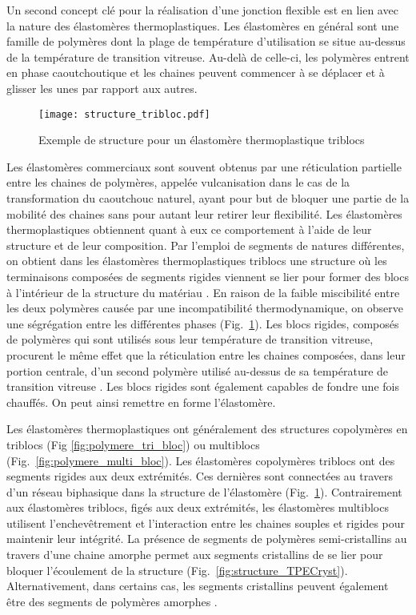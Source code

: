 Un second concept clé pour la réalisation d'une jonction flexible est en lien avec la nature des élastomères thermoplastiques. 
Les élastomères en général sont une famille de polymères dont la plage de température d'utilisation se situe au-dessus de la température de transition vitreuse. 
Au-delà de celle-ci, les polymères entrent en phase caoutchoutique et les chaines peuvent commencer à se déplacer et à glisser les unes par rapport aux autres. 

\begin{figure}[h]
	\centering
	\texttt{[image: structure\_tribloc.pdf]}
	\caption{Exemple de structure pour un élastomère thermoplastique triblocs}
	\label{fig:structure_tribloc}
\end{figure}

Les élastomères commerciaux sont souvent obtenus par une réticulation partielle entre les chaines de polymères, appelée vulcanisation dans le cas de la transformation du  caoutchouc naturel, ayant pour but de bloquer une partie de la mobilité des chaines sans pour autant leur retirer leur flexibilité. 
Les élastomères thermoplastiques obtiennent quant à eux ce comportement à l'aide de leur structure et de leur composition. 
Par l'emploi de segments de natures différentes, on obtient dans les élastomères thermoplastiques triblocs une structure où les terminaisons composées de segments rigides viennent se lier pour former des blocs à l'intérieur de la structure du matériau \cite{Holden1969}. 
En raison de la faible miscibilité entre les deux polymères causée par une incompatibilité thermodynamique, on observe une ségrégation entre les différentes phases (Fig.~\ref{fig:structure_tribloc}). 
Les blocs rigides, composés de polymères qui sont utilisés sous leur température de transition vitreuse, procurent le même effet que la réticulation entre les chaines composées, dans leur portion centrale, d'un second polymère utilisé au-dessus de sa température de transition vitreuse \cite{Holden2002}. 
Les blocs rigides sont également capables de fondre une fois chauffés.
On peut ainsi remettre en forme l'élastomère. 

Les élastomères thermoplastiques ont généralement des structures copolymères en triblocs (Fig \ref{fig:polymere_tri_bloc}) ou multiblocs (Fig.~\ref{fig:polymere_multi_bloc}). 
Les élastomères copolymères triblocs ont des segments rigides aux deux extrémités. 
Ces dernières sont connectées au travers d'un réseau biphasique dans la structure de l'élastomère (Fig.~\ref{fig:structure_tribloc}). 
Contrairement aux élastomères triblocs, figés aux deux extrémités, les élastomères multiblocs utilisent l'enchevêtrement et l'interaction entre les chaines souples et rigides pour maintenir leur intégrité. 
La présence de segments de polymères semi-cristallins au travers d'une chaine amorphe permet aux segments cristallins de se lier pour bloquer l'écoulement de la structure (Fig.~\ref{fig:structure_TPECryst}). 
Alternativement, dans certains cas, les segments cristallins peuvent également être des segments de polymères amorphes \cite{Holden2002}. 

